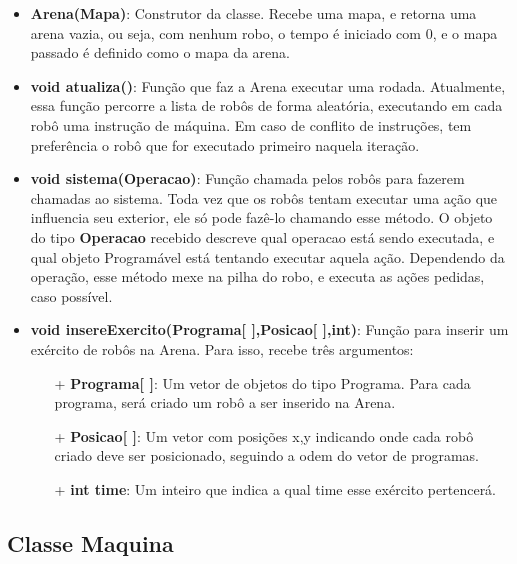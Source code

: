 \documentclass[11pt]{article}
\begin{document}
\begin{itemize}

\item \textbf{Arena({\color{red}Mapa})}: Construtor da classe. Recebe uma mapa, e retorna uma arena vazia, ou seja, com nenhum robo, o tempo é iniciado com 0, e o mapa passado é definido como o mapa da arena.

\item \textbf{{\color{red}void} atualiza()}: Função que faz a Arena executar uma rodada. Atualmente, essa função percorre a lista de robôs de forma aleatória, executando em cada robô uma instrução de máquina. Em caso de conflito de instruções, tem preferência o robô que for executado primeiro naquela iteração.

\item \textbf{{\color{red}void} sistema({\color{red}Operacao})}: Função chamada pelos robôs para fazerem chamadas ao sistema. Toda vez que os robôs tentam executar uma ação que influencia seu exterior, ele só pode fazê-lo chamando esse método. O objeto do tipo \textbf{\color{red}Operacao} recebido descreve qual operacao está sendo executada, e qual objeto Programável está tentando executar aquela ação. Dependendo da operação, esse método mexe na pilha do robo, e executa as ações pedidas, caso possível.

\item \textbf{{\color{red}void} insereExercito({\color{red}Programa[ ]},{\color{red}Posicao[ ]},{\color{red}int})}: Função para inserir um exército de robôs na Arena. Para isso, recebe três argumentos:
		\begin{itemize}
			
			\item[+] \textbf{Programa[ ]}: Um vetor de objetos do 				tipo {\color{red}Programa}. Para cada programa, será criado um robô a ser inserido na Arena.
			
			\item[+] \textbf{Posicao[ ]}: Um vetor com posições x,y 				indicando onde cada robô criado deve ser posicionado, 				seguindo a odem do vetor de programas.
			
			\item[+] \textbf{{\color{red}int} time}: Um inteiro que 				indica a qual time esse exército pertencerá.  			
			
		\end{itemize}				

\end{itemize}


\subsection{Classe Maquina}
\end{document}
